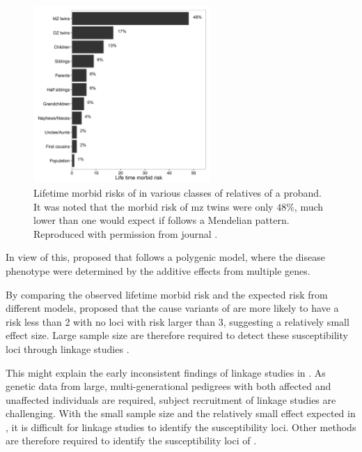 	\begin{figure}[t]
		\centering
		\includegraphics[width=0.6\textwidth]{figure/lifeTimeMorbidRisk.png}
		\caption[Lifetime morbid risks of  in various classes of relatives of a proband]{Lifetime morbid risks of  in various classes of relatives of a proband.
			It was noted that the morbid risk of \gls{mz} twins were only $48\%$, much lower than one would expect if  follows a Mendelian pattern.
			Reproduced with permission from journal \citep{Riley2006}. \label{fig:lifeMRscz}}
	\end{figure}
	
	In view of this, \citet{Gottesman1967} proposed that  follows a polygenic model, where the disease phenotype were determined by the additive effects from multiple genes.
	
	By comparing the observed lifetime morbid risk and the expected risk from different models, \citet{Risch1990} proposed that the cause variants of  are more likely to have a risk less than 2 with no loci with risk larger than 3, suggesting a relatively small effect size.
	Large sample size are therefore required to detect these susceptibility loci through linkage studies \citep{Risch1990}.
	
	This might explain the early inconsistent findings of linkage studies in  \citep{Harrison2005}.
	As genetic data from large, multi-generational pedigrees with both affected and unaffected individuals are required, subject recruitment of linkage studies are challenging. 
	With the small sample size and the relatively small effect expected in , it is difficult for linkage studies to identify the susceptibility loci. 
	Other methods are therefore required to identify the susceptibility loci of .
	
